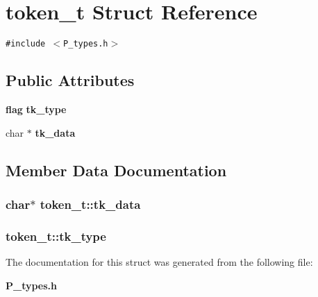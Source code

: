 \section{token\_\-t  Struct Reference}
\label{structtoken__t}
{\tt \#include $<$P\_\-types.h$>$}

\subsection*{Public Attributes}
\begin{CompactItemize}
\item 
{\bf flag} {\bf tk\_\-type}
\item 
char $\ast$ {\bf tk\_\-data}
\end{CompactItemize}


\subsection{Member Data Documentation}
\subsubsection{\setlength{\rightskip}{0pt plus 5cm}char$\ast$ token\_\-t::tk\_\-data}\label{structtoken__t_m1}


\subsubsection{ token\_\-t::tk\_\-type}\label{structtoken__t_m0}




The documentation for this struct was generated from the following file:\begin{CompactItemize}
\item 
{\bf P\_\-types.h}\end{CompactItemize}

